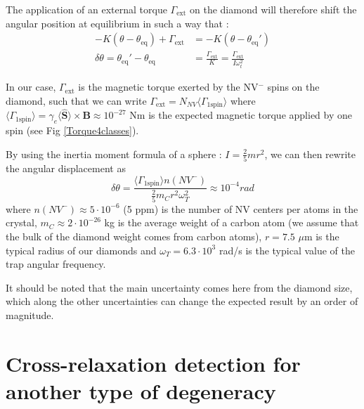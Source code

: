 \documentclass[preprintnumbers,amsmath,amssymb,onecolumn,12pt]{revtex4}
\begin{document}
The application of an external torque $\Gamma_{\mathrm{ext}}$ on the diamond will therefore shift the angular position at equilibrium in such a way that : 
\begin{align*}
-K(\theta-\theta_{\mathrm{eq}}) + \Gamma_{\mathrm{ext}} &= -K(\theta-\theta_{\mathrm{eq}}') \\
\delta\theta = \theta_{\mathrm{eq}}'-\theta_{\mathrm{eq}} &= \frac{\Gamma_{\mathrm{ext}}}{K}=\frac{\Gamma_{\mathrm{ext}}}{I \omega_t^2}
\end{align*}

In our case, $\Gamma_{\mathrm{ext}}$ is the magnetic torque exerted by the NV$^-$ spins on the diamond, such that we can write $\Gamma_{\mathrm{ext}} = N_{NV} \langle \Gamma_{\mathrm{1 spin}} \rangle$  where $\langle \Gamma_{\mathrm{1 spin}} \rangle = \gamma_e \langle\hat{\mathbf S}\rangle \times \mathbf B \approx 10^{-27}$ Nm is the expected magnetic torque applied by one spin (see Fig \ref{Torque4classes}). 

By using the inertia moment formula of a sphere : $I=\frac{2}{5}m r^2$, we can then rewrite the angular displacement as $$ \delta\theta = \frac{\langle\Gamma_{\mathrm{1 spin}}\rangle n(NV^-)}{\frac{2}{5}m_Cr^2\omega_T^2} \approx 10^{-4} rad$$ where $n(NV^-) \approx 5 \cdot 10^{-6}$ (5 ppm) is the number of NV centers per atoms in the crystal, $m_C \approx 2 \cdot 10^{-26}$ kg is the average weight of a carbon atom (we assume that the bulk of the diamond weight comes from carbon atoms), $r= 7.5$ $\mu$m is the typical radius of our diamonds and $\omega_T = 6.3\cdot 10^3$ rad/s is the typical value of the trap angular frequency.

It should be noted that the main uncertainty comes here from the diamond size, which along the other uncertainties can change the expected result by an order of magnitude.

\section{Cross-relaxation detection for another type of degeneracy}
\end{document}

